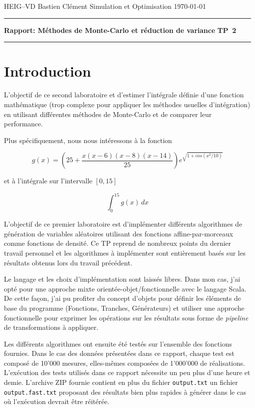 \documentclass[a4paper,11pt]{article}
\begin{document}
	
{\sc HEIG--VD} \hfill Bastien Clément\newline 
Simulation et Optimisation \hfill \today \newline
\hrule
\vspace{2mm}
{\large \bf Rapport: Méthodes de Monte-Carlo et réduction de variance} \hfill {\large \bf TP~2}
\vspace{4mm}
\hrule

\tableofcontents

\section{Introduction}

L'objectif de ce second laboratoire et d'estimer l'intégrale définie d'une fonction mathématique (trop complexe pour appliquer les méthodes usuelles d'intégration) en utilisant différentes méthodes de Monte-Carlo et de comparer leur performance.

Plus spécifiquement, nous nous intéressons à la fonction

\[
	g(x) = \left( 25 + \frac{x(x-6)(x-8)(x-14)}{25} \right) e^{\sqrt{1+cos(x^2/10)}}
\]

et à l'intégrale sur l'intervalle $[0,15]$

\[
	\int_{0}^{15} g(x) \,dx
\]

L'objectif de ce premier laboratoire est d'implémenter différents algorithmes de génération de variables aléatoires utilisant des fonctions affine-par-morceaux comme fonctions de densité. Ce TP reprend de nombreux points du dernier travail personnel et les algorithmes à implémenter sont entièrement basés sur les résultats obtenus lors du travail précédent.

Le langage et les choix d'implémentation sont laissés libres. Dans mon cas, j'ai opté pour une approche mixte orientée-objet/fonctionnelle avec le langage Scala. De cette façon, j'ai pu profiter du concept d'objets pour définir les éléments de base du programme (Fonctions, Tranches, Générateurs) et utiliser une approche fonctionnelle pour exprimer les opérations sur les résultats sous forme de \emph{pipeline} de transformations à appliquer.

Les différents algorithmes ont ensuite été testés sur l'ensemble des fonctions fournies. Dans le cas des données présentées dans ce rapport, chaque test est composé de 10'000 mesures, elles-mêmes composées de 1'000'000 de réalisations. L'exécution des tests utilisés dans ce rapport nécessite un peu plus d'une heure et demie. L'archive ZIP fournie contient en plus du fichier \texttt{output.txt} un fichier \texttt{output.fast.txt} proposant des résultats bien plus rapides à générer dans le cas où l'exécution devrait être réitérée.
\end{document}
